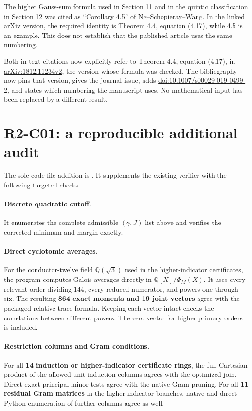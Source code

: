 \documentclass[11pt,a4paper]{article}
\begin{document}
The higher Gauss-sum formula used in Section 11 and in the quintic
classification in Section 12 was cited as ``Corollary 4.5'' of
Ng--Schopieray--Wang.
In the linked arXiv version, the required identity is Theorem 4.4,
equation (4.17), while 4.5 is an example. This does not establish that
the published article uses the same numbering.

Both in-text citations now explicitly refer to Theorem 4.4, equation
(4.17), in \href{https://arxiv.org/abs/1812.11234v2}{arXiv:1812.11234v2},
the version whose formula was checked. The bibliography now pins that
version, gives the journal issue, adds
\href{https://doi.org/10.1007/s00029-019-0499-2}{doi:10.1007/s00029-019-0499-2},
and states which numbering the manuscript uses. No mathematical input
has been replaced by a different result.

\section{R2-C01: a reproducible additional audit}

The sole code-file addition is
.
It supplements the existing verifier with the following targeted checks.

\paragraph{Discrete quadratic cutoff.}
It enumerates the complete admissible $(\gamma,J)$ list above and
verifies the corrected minimum and margin exactly.

\paragraph{Direct cyclotomic averages.}
For the conductor-twelve field $\mathbb Q(\sqrt3)$ used in the
higher-indicator certificates, the program computes Galois averages
directly in $\mathbb Q[X]/\Phi_M(X)$. It uses every relevant order
dividing $144$, every reduced numerator, and powers one through six.
The resulting \textbf{864 exact moments and 19 joint vectors} agree
with the packaged relative-trace formula. Keeping each vector intact
checks the correlations between different powers. The zero vector for
higher primary orders is included.

\paragraph{Restriction columns and Gram conditions.}
For all \textbf{14 induction or higher-indicator certificate rings},
the full Cartesian product of the allowed unit-induction columns agrees
with the optimized join. Direct exact principal-minor tests agree with
the native Gram pruning. For all \textbf{11 residual Gram matrices}
in the higher-indicator branches, native and direct Python enumeration
of further columns agree as well.
\end{document}

